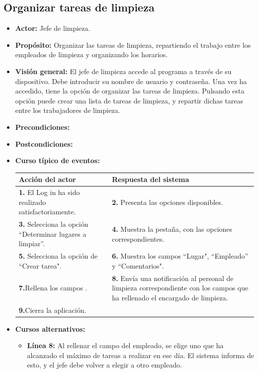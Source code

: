 \documentclass[spanish,a4paper,11pt, twoside]{report}	%
\begin{document}
	\subsection{Organizar tareas de limpieza}
			\begin{itemize}
			\item \textbf{Actor: }Jefe de limpieza.
			\item \textbf{Propósito: }Organizar las tareas de limpieza, repartiendo el trabajo entre los empleados de limpieza y organizando los horarios. 		
			\item \textbf{Visión general: }El jefe de limpieza accede al programa a través de su dispositivo. Debe introducir su nombre de usuario y contraseña. Una vez ha accedido, tiene la opción de organizar las tareas de limpieza. Pulsando esta opción puede crear una lista de tareas de limpieza, y repartir dichas tareas entre los trabajadores de limpieza. 
			\item \textbf{Precondiciones:} 
			\item \textbf{Postcondiciones:} 
			\item \textbf{Curso típico de eventos:} \\
\begin{tabular}{|p{6cm}||p{6cm}|}
				\hline
				\textbf{Acción del actor} & \textbf{Respuesta del sistema} \\ \hline \hline
				\textbf{1.} El Log in ha sido realizado satisfactoriamente. & \textbf{2.} Presenta las opciones disponibles.\\ \hline
				\textbf{3.} Selecciona la opción “Determinar lugares a limpiar”. & \textbf{4.} Muestra la pestaña, con las opciones correspondientes. \\ \hline
				\textbf{5.} Selecciona la opción de “Crear tarea".	& \textbf{6.} Muestra los campos “Lugar", “Empleado'' y “Comentarios". \\ \hline
				\textbf{7.}Rellena los campos . & \textbf{8.} Envía una notificación al personal de limpieza correspondiente con los campos que ha rellenado el encargado de limpieza.\\ \hline
				\textbf{9.}Cierra la aplicación. & \textbf{} \\ \hline
			\end{tabular}

			\item \textbf{Cursos alternativos:} 
				\begin {itemize}
					
					\item \textbf{Línea 8: } Al rellenar el campo del empleado, se elige uno que ha alcanzado el máximo de tareas a realizar en ese día. El sistema informa de esto, y el jefe debe volver a elegir a otro empleado.
				\end {itemize}
			\end{itemize}%
\end{document}

